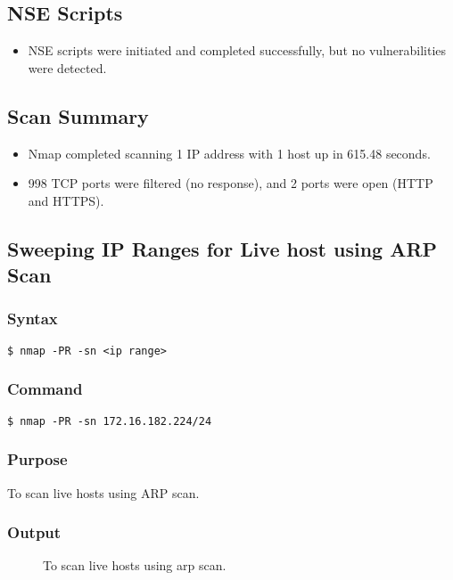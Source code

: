 \documentclass[11pt]{article}
\begin{document}
\subsection*{NSE Scripts}
\begin{itemize}
    \item NSE scripts were initiated and completed successfully, but no vulnerabilities were detected.
\end{itemize}

\subsection*{Scan Summary}
\begin{itemize}
    \item Nmap completed scanning 1 IP address with 1 host up in 615.48 seconds.
    \item 998 TCP ports were filtered (no response), and 2 ports were open (HTTP and HTTPS).
\end{itemize}



\subsection{Sweeping IP Ranges for Live host using ARP Scan}

\subsubsection{Syntax}
\begin{verbatim}
$ nmap -PR -sn <ip range>
\end{verbatim}

\subsubsection*{Command}
\begin{verbatim}
$ nmap -PR -sn 172.16.182.224/24
\end{verbatim}

\subsubsection*{Purpose}
To scan live hosts using ARP scan.

\subsubsection*{Output}
\begin{figure}[H]
    \centering
    \caption{To scan live hosts using arp scan.}
    \label{fig:1}
\end{figure}
\end{document}
